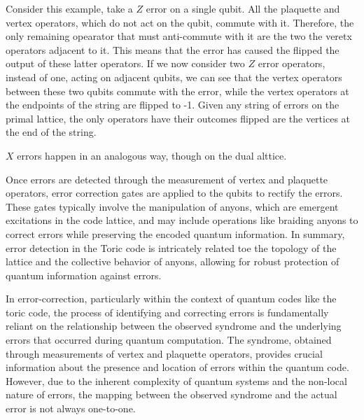\documentclass[12pt]{report}
\begin{document}
	\begin{minipage}{1 \textwidth}
		
		Consider this example, take a $Z$ error on a single qubit. All the plaquette and vertex operators, which do not act on the qubit, commute with it. Therefore, the only remaining opearator that must anti-commute with it are the two the veretx operators adjacent to it. This means that the error has caused the flipped the output of these latter operators. 
		If we now consider two $Z$ error operators, instead of one, acting on adjacent qubits, we can see that the vertex operators between these two qubits commute with the error, while the vertex operators at the endpoints of the string are flipped to -1.
		Given any string of errors on the primal lattice, the only operators have their outcomes flipped are the vertices at the
		end of the string. \newline
		
		
		$X$ errors happen in an analogous way, though on the dual alttice. \newline
		
		Once errors are detected through the measurement of vertex and plaquette operators, error correction gates are applied to the qubits to rectify the errors. These gates typically involve the manipulation of anyons, which are emergent excitations in the code lattice, and may include operations like braiding anyons to correct errors while preserving the encoded quantum information. In summary, error detection in the Toric code is intricately related toe
	    the topology of the lattice and the collective behavior of anyons, allowing for robust protection of quantum information against errors. \newline
		
		In error-correction, particularly within the context of quantum codes like the toric code, the process of identifying and correcting errors is fundamentally reliant on the relationship between the observed syndrome and the underlying errors that occurred during quantum computation. The syndrome, obtained through measurements of vertex and plaquette operators, provides crucial information about the presence and location of errors within the quantum code. However, due to the inherent complexity of quantum systems and the non-local nature of errors, the mapping between the observed syndrome and the actual error is not always one-to-one. \newline
		

\end{minipage}
\end{document}
